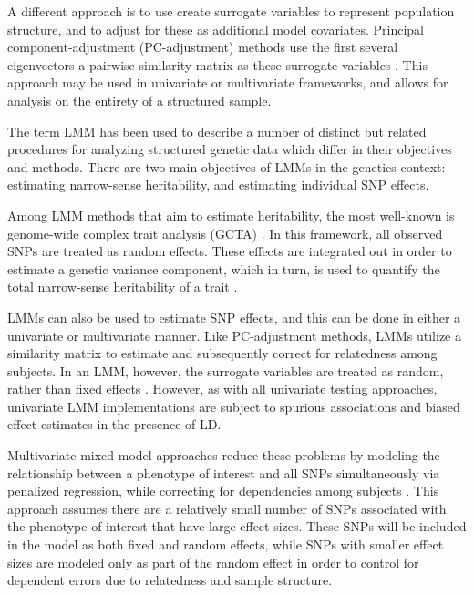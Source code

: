 A different approach is to use create surrogate variables to represent population structure, and to adjust for these as additional model covariates. Principal component-adjustment (PC-adjustment) methods use the first several eigenvectors a pairwise similarity matrix as these surrogate variables \citep{price2006principal}. This approach may be used in univariate or multivariate frameworks, and allows for analysis on the entirety of a structured sample. 

The term LMM has been used to describe a number of distinct but related procedures for analyzing structured genetic data which differ in their objectives and methods. There are two main objectives of LMMs in the genetics context: estimating narrow-sense heritability, and estimating individual SNP effects.

Among LMM methods that aim to estimate heritability, the most well-known is genome-wide complex trait analysis (GCTA) \citep{yang2011gcta}. In this framework, all observed SNPs are treated as random effects. These effects are integrated out in order to estimate a genetic variance component, which in turn, is used to quantify the total narrow-sense heritability of a trait \citep{yang2010common}.

LMMs can also be used to estimate SNP effects, and this can be done in either a univariate or multivariate manner. Like PC-adjustment methods, LMMs utilize a similarity matrix to estimate and subsequently correct for relatedness among subjects. In an LMM, however, the surrogate variables are treated as random, rather than fixed effects \citep{yu2006unified, kang2010variance, kang2008efficient}. However, as with all univariate testing approaches, univariate LMM implementations are subject to spurious associations and biased effect estimates in the presence of LD. 

Multivariate mixed model approaches reduce these problems by modeling the relationship between a phenotype of interest and all SNPs simultaneously via penalized regression, while correcting for dependencies among subjects \citep{rakitsch2013lasso, bhatnagar2020simultaneous}. This approach assumes there are a relatively small number of SNPs associated with the phenotype of interest that have large effect sizes. These SNPs will be included in the model as both fixed and random effects, while SNPs with smaller effect sizes are modeled only as part of the random effect in order to control for dependent errors due to relatedness and sample structure.


